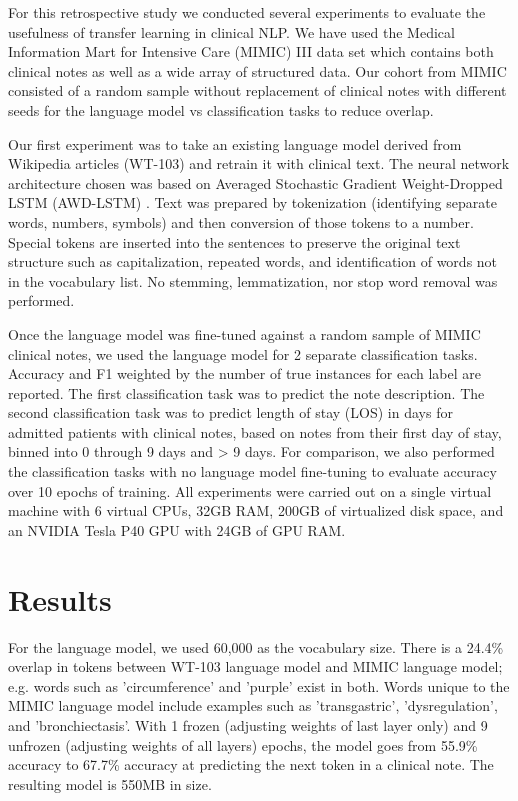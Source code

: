 \documentclass{amia}
\begin{document}
For this retrospective study we conducted several experiments to evaluate the usefulness of transfer learning in clinical NLP. We have used the Medical Information Mart for Intensive Care (MIMIC) III \cite{johnson_mimic-iii_2016} data set which contains both clinical notes as well as a wide array of structured data. Our cohort from MIMIC consisted of a random sample without replacement of clinical notes with different seeds for the language model vs classification tasks to reduce overlap.

Our first experiment was to take an existing language model derived from Wikipedia articles (WT-103) \cite{Merity2016Sep} and retrain it with clinical text. The neural network architecture chosen was based on Averaged Stochastic Gradient Weight-Dropped LSTM (AWD-LSTM) \cite{Merity2017Aug}. Text was prepared by tokenization (identifying separate words, numbers, symbols) and then conversion of those tokens to a number. Special tokens are inserted into the sentences to preserve the original text structure such as capitalization, repeated words, and identification of words not in the vocabulary list. No stemming, lemmatization, nor stop word removal was performed.

Once the language model was fine-tuned against a random sample of MIMIC clinical notes, we used the language model for 2 separate classification tasks. Accuracy and F1 weighted by the number of true instances for each label are reported. The first classification task was to predict the note description. The second classification task was to predict length of stay (LOS) in days for admitted patients with clinical notes, based on notes from their first day of stay, binned into 0 through 9 days and > 9 days. For comparison, we also performed the classification tasks with no language model fine-tuning to evaluate accuracy over 10 epochs of training. All experiments were carried out on a single virtual machine with 6 virtual CPUs, 32GB RAM, 200GB of virtualized disk space, and an NVIDIA Tesla P40 GPU with 24GB of GPU RAM.

\section*{Results}

For the language model, we used 60,000 as the vocabulary size. There is a 24.4\% overlap in tokens between WT-103 language model and MIMIC language model; e.g. words such as 'circumference' and 'purple' exist in both. Words unique to the MIMIC language model include examples such as 'transgastric', 'dysregulation', and 'bronchiectasis'. With 1 frozen (adjusting weights of last layer only) and 9 unfrozen (adjusting weights of all layers) epochs, the model goes from 55.9\% accuracy to 67.7\% accuracy at predicting the next token in a clinical note. The resulting model is 550MB in size.
\end{document}
